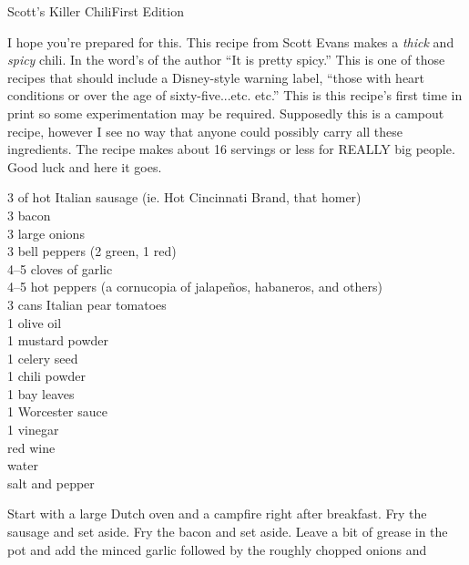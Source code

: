 \begin{entry}{Scott's Killer Chili}{First Edition}

\begin{open}
  I hope you're prepared for this.  This recipe from Scott Evans makes a {\em
  thick} and {\em spicy} chili.  In the word's of the author ``It is pretty
  spicy.''  This is one of those recipes that should include a Disney-style
  warning label, ``\textellipsis those with heart conditions or over the age of
  sixty-five...etc. etc.''  This is this recipe's first time in print so some
  experimentation may be required.  Supposedly this is a campout recipe, however
  I see no way that anyone could possibly carry all these ingredients. The
  recipe makes about 16 servings or less for REALLY big people.  Good luck and
  here it goes.
\end{open}
\begin{ingredients}
  \SI{3}{\pound} of hot Italian sausage (ie. Hot Cincinnati Brand, that homer) \\
  \SI{3}{\pound} bacon \\
  3 large onions \\
  3 bell peppers (2 green, 1 red) \\
  \numrange{4}{5} cloves of garlic \\
  \numrange{4}{5} hot peppers (a cornucopia of jalape\~{n}os, habaneros, and
  others) \\
  3 cans Italian pear tomatoes \\
  \SI{1}{\tblspoon} olive oil \\
  \SI{1}{\tblspoon} mustard powder \\
  \SI{1}{\tblspoon} celery seed \\
  \SI{1}{\tblspoon} chili powder \\
  \SI{1}{\tblspoon} bay leaves \\
  \SI{1}{\tblspoon} Worcester sauce \\
  \SI{1}{\tblspoon} vinegar \\
  red wine \\
  water \\
  salt and pepper
\end{ingredients}
Start with a large Dutch oven and a campfire right after breakfast.  Fry the
sausage and set aside.  Fry the bacon and set aside.  Leave a bit of grease in
the pot and add the minced garlic followed by the roughly chopped onions and

\end{entry}
